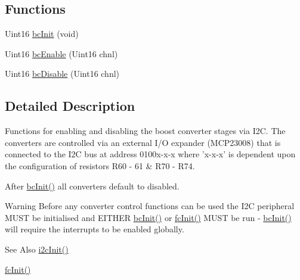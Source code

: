\subsection*{Functions}
\begin{DoxyCompactItemize}
\item 
Uint16 \hyperlink{a00007_aa6cb02a7aacce8671212b21ed6e39863}{bc\-Init} (void)
\item 
Uint16 \hyperlink{a00007_af10c5e095b6142ee37930042bd1da708}{bc\-Enable} (Uint16 chnl)
\item 
Uint16 \hyperlink{a00007_a3df6954c93c9089cdc750fff4b89da3e}{bc\-Disable} (Uint16 chnl)
\end{DoxyCompactItemize}


\subsection{Detailed Description}
Functions for enabling and disabling the boost converter stages via I2\-C. The converters are controlled via an external I/\-O expander (M\-C\-P23008) that is connected to the I2\-C bus at address 0100x-\/x-\/x where 'x-\/x-\/x' is dependent upon the configuration of resistors R60 -\/ 61 \& R70 -\/ R74.

After \hyperlink{a00007_aa6cb02a7aacce8671212b21ed6e39863}{bc\-Init()} all converters default to disabled.

\begin{DoxyWarning}{Warning}
Before any converter control functions can be used the I2\-C peripheral M\-U\-S\-T be initialised and E\-I\-T\-H\-E\-R \hyperlink{a00007_aa6cb02a7aacce8671212b21ed6e39863}{bc\-Init()} or \hyperlink{a00015_a3506b5e25346351ce292e2ad256607cc}{fc\-Init()} M\-U\-S\-T be run -\/ \hyperlink{a00007_aa6cb02a7aacce8671212b21ed6e39863}{bc\-Init()} will require the interrupts to be enabled globally.
\end{DoxyWarning}
\begin{DoxySeeAlso}{See Also}
\hyperlink{a00017_a1e0a81a1ad1fd7710ca189236e3e5476}{i2c\-Init()} 

\hyperlink{a00015_a3506b5e25346351ce292e2ad256607cc}{fc\-Init()} 
\end{DoxySeeAlso}


